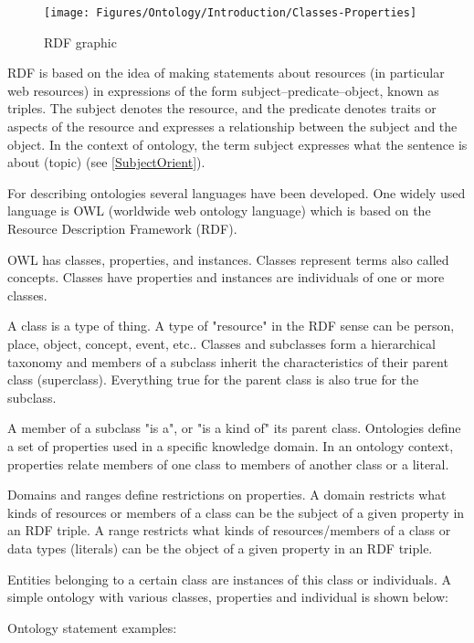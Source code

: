 \begin{figure}[h]
	\centering
	\texttt{[image: Figures/Ontology/Introduction/Classes-Properties]}
	\caption[RDF graphic]{RDF graphic}
	\label{fig:classes-properties}
\end{figure}

RDF is based on the idea of making statements about resources (in particular web resources) in expressions of the form subject–predicate–object, known as triples. The subject denotes the resource, and the predicate denotes traits or aspects of the resource and expresses a relationship between the subject and the object. In the context of ontology, the term subject expresses what the sentence is about (topic) (see \ref{SubjectOrient}).

For describing ontologies several languages have been developed. One widely used language is OWL (worldwide web ontology language) which is based on the Resource Description Framework (RDF).

OWL has classes, properties, and instances. Classes represent terms also called concepts. Classes have properties and instances are individuals of one or more classes.

A class is a type of thing. A type of "resource" in the RDF sense can be
person, place, object, concept, event, etc.. Classes and subclasses form a hierarchical taxonomy and members of a subclass inherit the characteristics of their parent class (superclass). Everything true for the parent class is also true for the subclass.

A member of a subclass "is a", or "is a kind of" its parent class. Ontologies define a set of properties used in a specific knowledge domain. In an ontology context, properties relate members of one class to members of another class or a literal.

Domains and ranges define restrictions on properties. A domain restricts what kinds of resources or members of a class can be the subject of a given property in an RDF triple. A range restricts what kinds of resources/members of a class or data types (literals) can be the object of a given property in an RDF triple.

Entities belonging to a certain class are instances of this class or individuals. A simple ontology with various classes, properties and individual is shown below:

Ontology statement examples:

